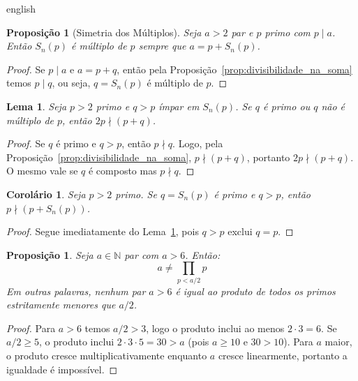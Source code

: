\documentclass[a4paper,11pt]{article}
\newtheorem{lemma}[theorem]{Lema}
\newtheorem{proposition}[theorem]{Proposição}
\newtheorem{corollary}[theorem]{Corolário}
\theoremstyle{definition}
\theoremstyle{remark}
\begin{document}
\begin{otherlanguage*}{english}
		\begin{proposition}[Simetria dos Múltiplos]\label{prop:simetria_dos_multiplos}
			Seja $a > 2$ par e $p$ primo com $p \mid a$. Então $S_n(p)$ é múltiplo
			de $p$ sempre que $a = p + S_n(p)$.
		\end{proposition}
		
		\begin{proof}
			Se $p \mid a$ e $a = p + q$, então pela
			Proposição~\ref{prop:divisibilidade_na_soma} temos $p \mid q$, ou seja,
			$q = S_n(p)$ é múltiplo de $p$.
		\end{proof}
		
		\begin{lemma}\label{lema:multip}
			Seja $p > 2$ primo e $q > p$ ímpar em $S_n(p)$. Se $q$ é primo ou
			$q$ não é múltiplo de $p$, então $2p \nmid (p + q)$.
		\end{lemma}
		
		\begin{proof}
			Se $q$ é primo e $q > p$, então $p \nmid q$. Logo, pela
			Proposição~\ref{prop:divisibilidade_na_soma}, $p \nmid (p+q)$, portanto
			$2p \nmid (p+q)$. O mesmo vale se $q$ é composto mas $p \nmid q$.
		\end{proof}
		
		\begin{corollary}
			Seja $p > 2$ primo. Se $q = S_n(p)$ é primo e $q > p$, então
			$p \nmid (p + S_n(p))$.
		\end{corollary}
		
		\begin{proof}
			Segue imediatamente do Lema~\ref{lema:multip}, pois $q > p$ exclui
			$q = p$.
		\end{proof}
		
		\begin{proposition}\label{prop:produto_p_menores_a_meio}
			Seja $a \in \mathbb{N}$ par com $a > 6$. Então:
			\[
			a \neq \prod_{p < a/2} p
			\]
			Em outras palavras, nenhum par $a > 6$ é igual ao produto de todos os
			primos estritamente menores que $a/2$.
		\end{proposition}
		
		\begin{proof}
			Para $a > 6$ temos $a/2 > 3$, logo o produto inclui ao menos $2 \cdot 3
			= 6$. Se $a/2 \geq 5$, o produto inclui $2 \cdot 3 \cdot 5 = 30 > a$
			(pois $a \geq 10$ e $30 > 10$). Para $a$ maior, o produto cresce
			multiplicativamente enquanto $a$ cresce linearmente, portanto a
			igualdade é impossível.
		\end{proof}
		

\end{otherlanguage*}
\end{document}
